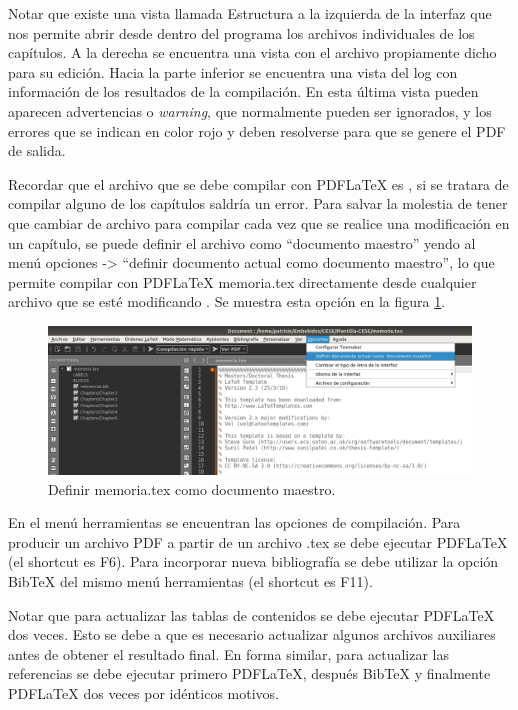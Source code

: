 Notar que existe una vista llamada Estructura a la izquierda de la interfaz que nos permite abrir desde dentro del programa los archivos individuales de los capítulos.  A la derecha se encuentra una vista con el archivo propiamente dicho para su edición. Hacia la parte inferior se encuentra una vista del log con información de los resultados de la compilación.  En esta última vista pueden aparecen advertencias o \textit{warning}, que normalmente pueden ser ignorados, y los errores que se indican en color rojo y deben resolverse para que se genere el PDF de salida.

Recordar que el archivo que se debe compilar con PDFLaTeX es , si se tratara de compilar alguno de los capítulos saldría un error.  Para salvar la molestia de tener que cambiar de archivo para compilar cada vez que se realice una modificación en un capítulo, se puede definir el archivo  como ``documento maestro'' yendo al menú opciones -> ``definir documento actual como documento maestro'', lo que permite compilar con PDFLaTeX memoria.tex directamente desde cualquier archivo que se esté modificando . Se muestra esta opción en la figura \ref{fig:docMaestro}.

\begin{figure}[h]
	\centering
	\includegraphics[width=\textwidth]{./Figures/docMaestro.png}
	\caption{Definir memoria.tex como documento maestro.}
	\label{fig:docMaestro}
\end{figure}

En el menú herramientas se encuentran las opciones de compilación.  Para producir un archivo PDF a partir de un archivo .tex se debe ejecutar PDFLaTeX (el shortcut es F6). Para incorporar nueva bibliografía se debe utilizar la opción BibTeX del mismo menú herramientas (el shortcut es F11).

Notar que para actualizar las tablas de contenidos se debe ejecutar PDFLaTeX dos veces.  Esto se debe a que es necesario actualizar algunos archivos auxiliares antes de obtener el resultado final.  En forma similar, para actualizar las referencias se debe ejecutar primero PDFLaTeX, después BibTeX y finalmente PDFLaTeX dos veces por idénticos motivos.

